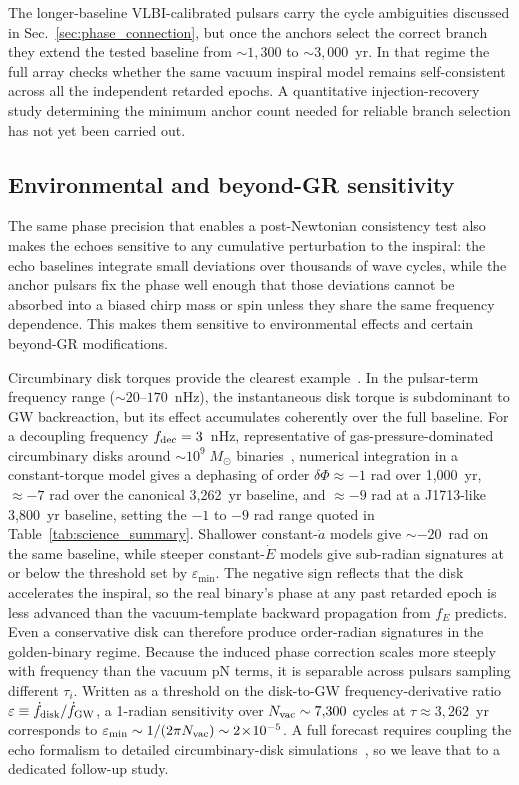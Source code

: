 \documentclass[aps,prx,twocolumn,superscriptaddress,nofootinbib,longbibliography]{revtex4-2}
\newcommand{\Msun}{M_\odot}
\begin{document}
The longer-baseline VLBI-calibrated pulsars carry the cycle ambiguities discussed in Sec.~\ref{sec:phase_connection}, but once the anchors select the correct branch they extend the tested baseline from $\sim1{,}300$ to $\sim3{,}000$~yr. In that regime the full array checks whether the same vacuum inspiral model remains self-consistent across all the independent retarded epochs. A quantitative injection-recovery study determining the minimum anchor count needed for reliable branch selection has not yet been carried out.

\subsection{Environmental and beyond-GR sensitivity}\label{sec:environment}

The same phase precision that enables a post-Newtonian consistency test also makes the echoes sensitive to any cumulative perturbation to the inspiral: the echo baselines integrate small deviations over thousands of wave cycles, while the anchor pulsars fix the phase well enough that those deviations cannot be absorbed into a biased chirp mass or spin unless they share the same frequency dependence. This makes them sensitive to environmental effects and certain beyond-GR modifications.

Circumbinary disk torques provide the clearest example~\cite{HaimanKocsisMenou2009,Duffell2020,Siwek2024}. In the pulsar-term frequency range ($\sim20$--$170$~nHz), the instantaneous disk torque is subdominant to GW backreaction, but its effect accumulates coherently over the full baseline. For a decoupling frequency $f_{\rm dec}=3$~nHz, representative of gas-pressure-dominated circumbinary disks around $\sim10^9\;\Msun$ binaries~\cite{HaimanKocsisMenou2009}, numerical integration in a constant-torque model gives a dephasing of order $\delta\Phi \approx -1$ rad over 1{,}000~yr, $\approx -7$ rad over the canonical 3{,}262~yr baseline, and $\approx -9$ rad at a J1713-like 3{,}800~yr baseline, setting the $-1$ to $-9$ rad range quoted in Table~\ref{tab:science_summary}. Shallower constant-$\dot a$ models give $\sim -20$~rad on the same baseline, while steeper constant-$\dot E$ models give sub-radian signatures at or below the threshold set by $\varepsilon_{\min}$. The negative sign reflects that the disk accelerates the inspiral, so the real binary's phase at any past retarded epoch is less advanced than the vacuum-template backward propagation from $f_E$ predicts. Even a conservative disk can therefore produce order-radian signatures in the golden-binary regime. Because the induced phase correction scales more steeply with frequency than the vacuum pN terms, it is separable across pulsars sampling different $\tau_i$. Written as a threshold on the disk-to-GW frequency-derivative ratio $\varepsilon \equiv \dot f_{\rm disk}/\dot f_{\rm GW}$, a 1-radian sensitivity over $N_{\rm vac}\sim7{,}300$ cycles at $\tau\approx3{,}262$~yr corresponds to $\varepsilon_{\min} \sim 1/(2\pi N_{\rm vac}) \sim 2\!\times\!10^{-5}$. A full forecast requires coupling the echo formalism to detailed circumbinary-disk simulations~\cite{SiwekWH2023,Tiede2025}, so we leave that to a dedicated follow-up study.
\end{document}
